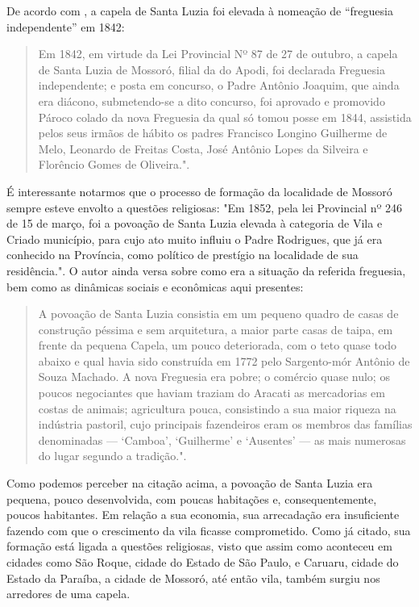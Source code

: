 \begin{refsection}
    De acordo com \textcite{Souza2010Historia}, a capela de Santa Luzia foi elevada à nomeação de ``freguesia independente'' em 1842:

    \begin{quotation}
        Em 1842, em virtude da Lei Provincial Nº 87 de 27 de outubro, a capela de Santa Luzia de Mossoró, filial da do Apodi, foi declarada Freguesia independente; e  posta em concurso, o Padre Antônio Joaquim, que ainda era diácono, submetendo-se a dito concurso, foi aprovado e promovido Pároco colado da nova Freguesia da qual só tomou posse em 1844, assistida pelos seus irmãos de hábito os padres Francisco Longino Guilherme de Melo, Leonardo de Freitas Costa, José Antônio Lopes da Silveira e Florêncio Gomes de Oliveira."\:\cite[p.~131]{Souza2010Historia}.
    \end{quotation}

    É interessante notarmos que o processo de formação da localidade de Mossoró sempre esteve envolto a questões religiosas: "Em 1852, pela lei Provincial nº 246 de 15 de março, foi a povoação de Santa Luzia elevada à categoria de Vila e Criado município, para cujo ato muito influiu o Padre Rodrigues, que já era conhecido na Província, como político de prestígio na localidade de sua residência."\:\cite[p.~135]{Souza2010Historia}. O autor ainda versa sobre como era a situação da referida freguesia, bem como as dinâmicas sociais e econômicas aqui presentes:

    \begin{quotation}
        A povoação de Santa Luzia consistia em um pequeno quadro de casas de construção péssima e sem arquitetura, a maior parte casas de taipa, em frente da pequena Capela, um pouco deteriorada, com o teto quase todo abaixo e qual havia sido construída em 1772 pelo Sargento-mór Antônio de Souza Machado. A nova Freguesia era pobre; o comércio quase nulo; os poucos negociantes que haviam traziam do Aracati as mercadorias em costas de animais; agricultura pouca, consistindo a sua maior riqueza na indústria pastoril, cujo principais fazendeiros eram os membros das famílias denominadas --- `Camboa', `Guilherme' e `Ausentes' --- as mais numerosas do lugar segundo a tradição."\:\cite[p.~132]{Souza2010Historia}.
    \end{quotation}

    Como podemos perceber na citação acima, a povoação de Santa Luzia era pequena, pouco desenvolvida, com poucas habitações e, consequentemente, poucos habitantes. Em relação a sua economia, sua arrecadação era insuficiente fazendo com que o crescimento da vila ficasse comprometido. Como já citado, sua formação está ligada a questões religiosas, visto que assim como aconteceu em cidades como São Roque, cidade do Estado de São Paulo, e Caruaru, cidade do Estado da Paraíba, a cidade de Mossoró, até então vila, também surgiu nos arredores de uma capela.


\end{refsection}

